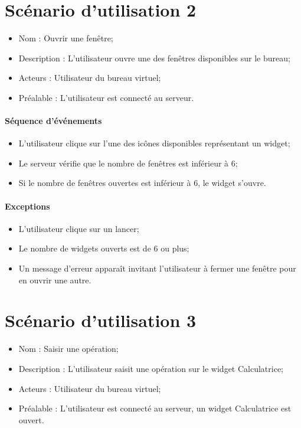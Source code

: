 
\section{Scénario d'utilisation 2}
\begin{itemize}
	\item Nom : Ouvrir une fenêtre;
	\item Description : L'utilisateur ouvre une des fenêtres disponibles sur le bureau;
	\item Acteurs : Utilisateur du bureau virtuel;
	\item Préalable : L'utilisateur est connecté au serveur.
\end{itemize}

\paragraph{Séquence d'événements}
\begin{itemize}
	\item L'utilisateur clique sur l'une des icônes disponibles représentant un widget;
	\item Le serveur vérifie que le nombre de fenêtres est inférieur à 6;
	\item Si le nombre de fenêtres ouvertes est inférieur à 6, le widget s'ouvre.
\end{itemize}

\paragraph{Exceptions}
\begin{itemize}
	\item L'utilisateur clique sur un lancer;
	\item Le nombre de widgets ouverts est de 6 ou plus;
	\item Un message d'erreur apparaît invitant l'utilisateur à fermer une fenêtre pour en ouvrir une autre.
\end{itemize}


\section{Scénario d'utilisation 3}
\begin{itemize}
	\item Nom : Saisir une opération;
	\item Description : L'utilisateur saisit une opération sur le widget Calculatrice;
	\item Acteurs : Utilisateur du bureau virtuel;
	\item Préalable : L'utilisateur est connecté au serveur, un widget Calculatrice est ouvert.
\end{itemize}

